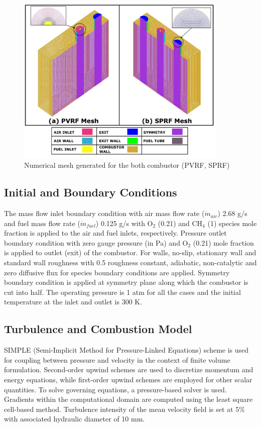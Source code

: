 \begin{figure}[!ht]
    \centering
	\includegraphics[width=0.9\textwidth]{Chapter4/Images/Mesh.png}
	\caption{Numerical mesh generated for the both combustor (PVRF, SPRF)}
	\label{Mesh}
\end{figure}

\subsection{Initial and Boundary Conditions}
The mass flow inlet boundary condition with  air mass flow rate ($\dot{m}_{air}$) 2.68 g/s and fuel mass flow rate ($\dot{m}_{fuel}$) 0.125 g/s with O$_2$ (0.21) and CH$_4$ (1) species mole fraction  is applied to the air and fuel inlets, respectively.
Pressure outlet boundary condition with zero gauge pressure (in Pa) and O$_2$ (0.21) mole fraction is applied to outlet (exit) of the combustor.
For walls, no-slip, stationary wall and standard wall roughness with 0.5 roughness constant, adiabatic, non-catalytic and zero diffusive flux for species boundary conditions are applied.
Symmetry boundary condition is applied at symmetry plane along which the combustor is cut into half. The operating pressure is 1 atm for all the cases and the initial temperature at the inlet and outlet is 300 K.

\subsection{Turbulence and Combustion Model}
SIMPLE (Semi-Implicit Method for Pressure-Linked Equations) scheme is used for coupling between pressure and velocity in the context of finite volume formulation. Second-order upwind schemes are used to discretize momentum and energy equations, while first-order upwind schemes are employed for other scalar quantities. To solve governing equations, a pressure-based solver is used. Gradients within the computational domain are computed using the least square cell-based method. Turbulence intensity of the mean velocity field is set at 5$\%$ with associated hydraulic diameter of 10 mm.

